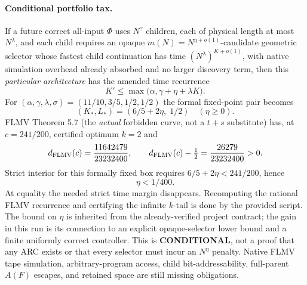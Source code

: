 \documentclass[10pt]{article}
\begin{document}
\paragraph{Conditional portfolio tax.}
If a future correct all-input $\Phi$ uses $N^\gamma$ children, each of physical length at most $N^\lambda$, and each child requires an opaque $m(N)=N^{\eta+o(1)}$-candidate geometric selector whose fastest child continuation has time $(N^\lambda)^{K+o(1)}$, with native simulation overhead already absorbed and no larger discovery term, then this \emph{particular architecture} has the amended time recurrence
\[
K'\le\max\bigl(\alpha,\gamma+\eta+\lambda K\bigr).
\]
For $(\alpha,\gamma,\lambda,\sigma)=(11/10,3/5,1/2,1/2)$ the formal fixed-point pair becomes
\[
(K_*,L_*)=(6/5+2\eta,\;1/2)\quad(\eta\ge0).
\]
FLMV Theorem 5.7 (the \emph{actual} forbidden curve, not a $t+s$ substitute) has, at $c=241/200$, certified optimum $k=2$ and
\[
d_{\rm FLMV}(c)=\frac{11642479}{23232400},\qquad
 d_{\rm FLMV}(c)-\tfrac12=\frac{26279}{23232400}>0.
\]
Strict interior for this formally fixed box requires $6/5+2\eta<241/200$, hence
\[
\boxed{\eta<1/400.}
\]
At equality the needed strict time margin disappears. Recomputing the rational FLMV recurrence and certifying the infinite $k$-tail is done by the provided script. The bound on $\eta$ is inherited from the already-verified project contract; the gain in this run is its connection to an explicit opaque-selector lower bound and a finite uniformly correct controller. This is \textbf{CONDITIONAL}, not a proof that any ARC exists or that every selector must incur an $N^\eta$ penalty. Native FLMV tape simulation, arbitrary-program access, child bit-addressability, full-parent $A(F)$ escapes, and retained space are still missing obligations.
\end{document}
